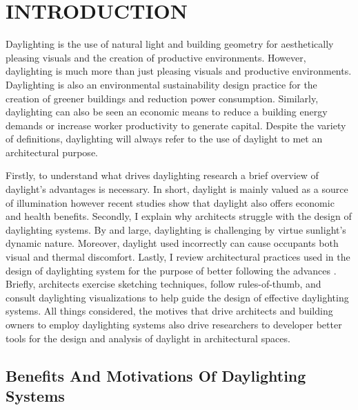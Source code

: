 
\chapter{INTRODUCTION} \label{sec:introduction}

Daylighting is the use of natural light and building geometry for aesthetically pleasing visuals and the creation of productive environments.
However, daylighting is much more than just pleasing visuals and productive environments.
Daylighting is also an environmental sustainability design practice for the creation of greener buildings and reduction power consumption.
Similarly, daylighting can also be seen an  economic means to reduce a building energy demands or increase worker productivity to generate capital.
Despite the variety of definitions, daylighting will always refer to the use of daylight to met an architectural purpose.

Firstly, to understand what drives daylighting research a brief overview of daylight's advantages is necessary.
In short, daylight is mainly valued as a source of illumination however recent studies show that daylight also offers economic and health benefits.
%
Secondly, I explain why architects struggle with the design of daylighting systems.
By and large, daylighting is challenging by virtue sunlight's dynamic nature.
Moreover, daylight used incorrectly can cause occupants both visual and thermal discomfort.
%
Lastly, I review architectural practices used in the design of daylighting system for the purpose of better following the advances .
Briefly, architects exercise sketching techniques, follow rules-of-thumb, and consult daylighting visualizations to help guide the design of effective daylighting systems. 
%
All things considered, the motives that drive architects and building owners to employ daylighting systems also drive researchers to developer better tools for the design and analysis of daylight in architectural spaces.\\

\section{Benefits And Motivations Of Daylighting Systems}
    
